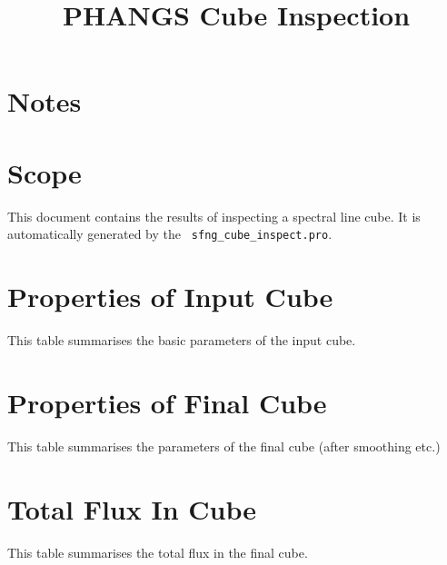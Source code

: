 \documentclass[11pt]{article}
\begin{document}
\title{PHANGS Cube Inspection}

\maketitle


\section{Notes}
\label{sect:notes}


\section{Scope}
\label{sec:scope}

\noindent This document contains the results of inspecting a spectral
line cube. It is automatically generated by the {\tt
  sfng\_cube\_inspect.pro}.

\section{Properties of Input Cube}
\label{sect:input_cube}
\noindent This table summarises the basic parameters of the input cube.


\section{Properties of Final Cube}
\label{sect:final_cube}
\noindent This table summarises the parameters of the final cube (after smoothing etc.)


\section{Total Flux In Cube}
\label{sect:totflux}
\noindent  This table summarises the total flux in the final cube.

\end{document}
